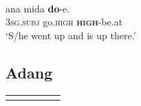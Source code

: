 \ea%
\label{ex:7:20}
 \\
\gll  {\textglotstop}ana  mida  \textbf{do}-{\textglotstop}e.  \\
  \textsc{3sg.subj} go.\textsc{high} \textbf{\textsc{high}}-be.at     \\
\glt   `S/he went up and is up there.'
\z







\subsection{Adang}\label{sec:7:3.5}

\begin{table}
\begin{tabularx}{\textwidth}{>{\sc}l>{\sc}l>{\it}l>{\it}l>{\it}X}
\lsptoprule


\end{tabularx}
\end{table}
